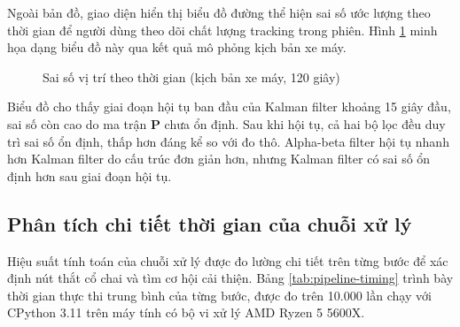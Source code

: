 \hspace{0.5cm} Ngoài bản đồ, giao diện hiển thị biểu đồ đường thể hiện sai số ước lượng theo thời gian để người dùng theo dõi chất lượng tracking trong phiên. Hình \ref{fig:error-over-time} minh họa dạng biểu đồ này qua kết quả mô phỏng kịch bản xe máy.

\begin{figure}[H]
\centering
{}
\caption{Sai số vị trí theo thời gian (kịch bản xe máy, 120 giây)}
\label{fig:error-over-time}
\end{figure}

Biểu đồ cho thấy giai đoạn hội tụ ban đầu của Kalman filter khoảng 15 giây đầu, sai số còn cao do ma trận $\mathbf{P}$ chưa ổn định. Sau khi hội tụ, cả hai bộ lọc đều duy trì sai số ổn định, thấp hơn đáng kể so với đo thô. Alpha-beta filter hội tụ nhanh hơn Kalman filter do cấu trúc đơn giản hơn, nhưng Kalman filter có sai số ổn định hơn sau giai đoạn hội tụ.

\subsection{Phân tích chi tiết thời gian của chuỗi xử lý}

\hspace{0.5cm} Hiệu suất tính toán của chuỗi xử lý được đo lường chi tiết trên từng bước để xác định nút thắt cổ chai và tìm cơ hội cải thiện. Bảng \ref{tab:pipeline-timing} trình bày thời gian thực thi trung bình của từng bước, được đo trên 10.000 lần chạy với CPython 3.11 trên máy tính có bộ vi xử lý AMD Ryzen 5 5600X.



